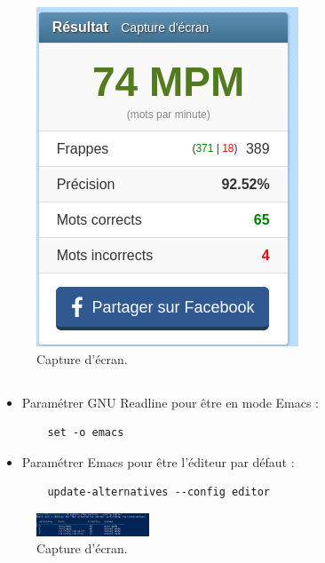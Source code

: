 \documentclass{article}
\begin{document}
\begin{figure}[h]
\centering
\includegraphics[maxwidth=0.8\textwidth]{images/q1-2.jpg}
\caption{\label{fig:frog}Capture d'écran.}
\end{figure}

\subsection{}

\begin{itemize}
    \item Paramétrer GNU Readline pour être en mode Emacs :
    \begin{lstlisting}
    set -o emacs
    \end{lstlisting}
    \item Paramétrer Emacs pour être l’éditeur par défaut :
    \begin{lstlisting}
    update-alternatives --config editor
    \end{lstlisting}
\end{itemize}

\begin{figure}[h]
\centering
\includegraphics[width=0.3\textwidth]{images/q1-3.jpg}
\caption{\label{fig:frog}Capture d'écran.}
\end{figure}

\subsection{}
\end{document}
